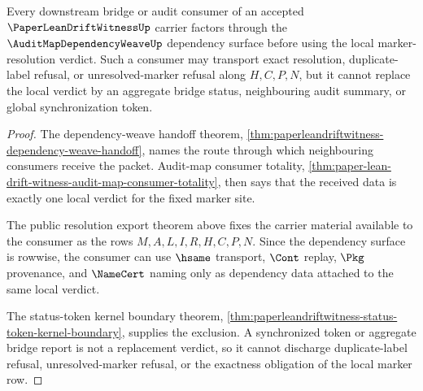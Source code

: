 \begin{theorem}
\label{thm:paper-lean-drift-witness-bridge-ready-dependency-surface}
Every downstream bridge or audit consumer of an accepted $\PaperLeanDriftWitnessUp$ carrier factors through the $\AuditMapDependencyWeaveUp$ dependency surface before using the local marker-resolution verdict. Such a consumer may transport exact resolution, duplicate-label refusal, or unresolved-marker refusal along $H,C,P,N$, but it cannot replace the local verdict by an aggregate bridge status, neighbouring audit summary, or global synchronization token.
\end{theorem}
\begin{proof}
The dependency-weave handoff theorem, \autoref{thm:paperleandriftwitness-dependency-weave-handoff}, names the route through which neighbouring consumers receive the packet. Audit-map consumer totality, \autoref{thm:paper-lean-drift-witness-audit-map-consumer-totality}, then says that the received data is exactly one local verdict for the fixed marker site.

The public resolution export theorem above fixes the carrier material available to the consumer as the rows $M,A,L,I,R,H,C,P,N$. Since the dependency surface is rowwise, the consumer can use $\hsame$ transport, $\Cont$ replay, $\Pkg$ provenance, and $\NameCert$ naming only as dependency data attached to the same local verdict.

The status-token kernel boundary theorem, \autoref{thm:paperleandriftwitness-status-token-kernel-boundary}, supplies the exclusion. A synchronized token or aggregate bridge report is not a replacement verdict, so it cannot discharge duplicate-label refusal, unresolved-marker refusal, or the exactness obligation of the local marker row.
\end{proof}

